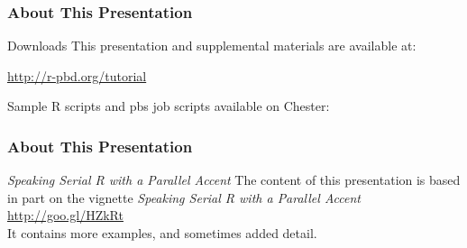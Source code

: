 \frame{
  \maketitle
}


\begin{frame}
\frametitle{About This Presentation}
 \begin{block}{Downloads}
  This presentation and supplemental materials are available at:
  \begin{center}
  \url{http://r-pbd.org/tutorial}
  \end{center}
  Sample R scripts and pbs job scripts available on Chester:\\[.2cm]
\centering{}
 \end{block}
\end{frame}


\begin{frame}
\frametitle{About This Presentation}
 \begin{block}{\emph{Speaking Serial R with a Parallel Accent}}
  The content of this presentation is based in part on the  
vignette \emph{Speaking Serial R with a Parallel Accent}\\[.4cm]
  \url{http://goo.gl/HZkRt}\\[.4cm]
  It contains more examples, and sometimes added detail.
 \end{block}
\end{frame}


